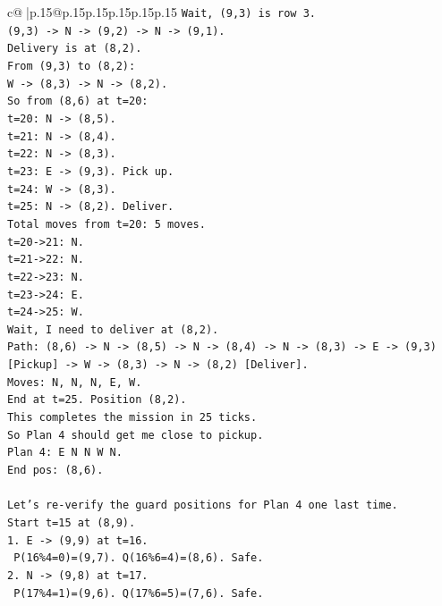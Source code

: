 \documentclass{article}
\begin{document}
{\begin{supertabular}{c@{$\;$}|p{.15\linewidth}@{}p{.15\linewidth}p{.15\linewidth}p{.15\linewidth}p{.15\linewidth}p{.15\linewidth}}
{{{\texttt{Wait, (9,3) is row 3.} \\
\texttt{(9,3) {-}> N {-}> (9,2) {-}> N {-}> (9,1).} \\
\texttt{Delivery is at (8,2).} \\
\texttt{From (9,3) to (8,2):} \\
\texttt{W {-}> (8,3) {-}> N {-}> (8,2).} \\
\texttt{So from (8,6) at t=20:} \\
\texttt{t=20: N {-}> (8,5).} \\
\texttt{t=21: N {-}> (8,4).} \\
\texttt{t=22: N {-}> (8,3).} \\
\texttt{t=23: E {-}> (9,3). Pick up.} \\
\texttt{t=24: W {-}> (8,3).} \\
\texttt{t=25: N {-}> (8,2). Deliver.} \\
\texttt{Total moves from t=20: 5 moves.} \\
\texttt{t=20{-}>21: N.} \\
\texttt{t=21{-}>22: N.} \\
\texttt{t=22{-}>23: N.} \\
\texttt{t=23{-}>24: E.} \\
\texttt{t=24{-}>25: W.} \\
\texttt{Wait, I need to deliver at (8,2).} \\
\texttt{Path: (8,6) {-}> N {-}> (8,5) {-}> N {-}> (8,4) {-}> N {-}> (8,3) {-}> E {-}> (9,3) {[}Pickup{]} {-}> W {-}> (8,3) {-}> N {-}> (8,2) {[}Deliver{]}.} \\
\texttt{Moves: N, N, N, E, W.} \\
\texttt{End at t=25. Position (8,2).} \\
\texttt{This completes the mission in 25 ticks.} \\
\texttt{So Plan 4 should get me close to pickup.} \\
\texttt{Plan 4: E N N W N.} \\
\texttt{End pos: (8,6).} \\
\\ 
\texttt{Let's re{-}verify the guard positions for Plan 4 one last time.} \\
\texttt{Start t=15 at (8,9).} \\
\texttt{1. E {-}> (9,9) at t=16.} \\
\texttt{   P(16\%4=0)=(9,7). Q(16\%6=4)=(8,6). Safe.} \\
\texttt{2. N {-}> (9,8) at t=17.} \\
\texttt{   P(17\%4=1)=(9,6). Q(17\%6=5)=(7,6). Safe.} \\
}}}
\end{supertabular}}
\end{document}
